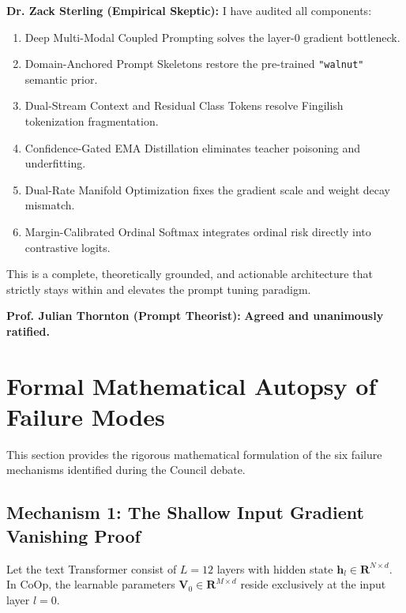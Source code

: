 \documentclass[letterpaper,11pt,leqno]{article}
\newcommand{\speakerThornton}[1]{\noindent\textbf{\color{blue!70!black}Prof. Julian Thornton (Prompt Theorist):} #1\vspace{0.4em}}
\newcommand{\speakerSterling}[1]{\noindent\textbf{\color{red!75!black}Dr. Zack Sterling (Empirical Skeptic):} #1\vspace{0.4em}}
\begin{document}
\speakerSterling{I have audited all components:
\begin{enumerate}
    \item Deep Multi-Modal Coupled Prompting solves the layer-0 gradient bottleneck.
    \item Domain-Anchored Prompt Skeletons restore the pre-trained \texttt{"walnut"} semantic prior.
    \item Dual-Stream Context and Residual Class Tokens resolve Fingilish tokenization fragmentation.
    \item Confidence-Gated EMA Distillation eliminates teacher poisoning and underfitting.
    \item Dual-Rate Manifold Optimization fixes the gradient scale and weight decay mismatch.
    \item Margin-Calibrated Ordinal Softmax integrates ordinal risk directly into contrastive logits.
\end{enumerate}
This is a complete, theoretically grounded, and actionable architecture that strictly stays within and elevates the prompt tuning paradigm.}

\speakerThornton{\textbf{Agreed and unanimously ratified.}}

\newpage
\section{Formal Mathematical Autopsy of Failure Modes}

This section provides the rigorous mathematical formulation of the six failure mechanisms identified during the Council debate.

\subsection{Mechanism 1: The Shallow Input Gradient Vanishing Proof}

Let the text Transformer consist of $L=12$ layers with hidden state $\mathbf{h}_l \in \mathbf{R}^{N \times d}$. In CoOp, the learnable parameters $\mathbf{V}_0 \in \mathbf{R}^{M \times d}$ reside exclusively at the input layer $l=0$.
\end{document}
